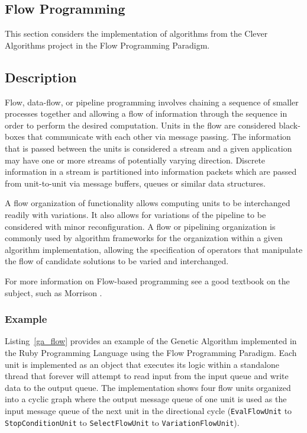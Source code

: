 % 
% 
\subsection{Flow Programming}
\label{sec:flow}
This section considers the implementation of algorithms from the Clever Algorithms project in the Flow Programming Paradigm.

\subsection{Description}
Flow, data-flow, or pipeline programming involves chaining a sequence of smaller processes together and allowing a flow of information through the sequence in order to perform the desired computation. Units in the flow are considered black-boxes that communicate with each other via message passing. The information that is passed between the units is considered a stream and a given application may have one or more streams of potentially varying direction. Discrete information in a stream is partitioned into information packets which are passed from unit-to-unit via message buffers, queues or similar data structures.

A flow organization of functionality allows computing units to be interchanged readily with variations. It also allows for variations of the pipeline to be considered with minor reconfiguration. A flow or pipelining organization is commonly used by algorithm frameworks for the organization within a given algorithm implementation, allowing the specification of operators that manipulate the flow of candidate solutions to be varied and interchanged.

For more information on Flow-based programming see a good textbook on the subject, such as Morrison \cite{Morrison2010}.

\subsubsection{Example}
Listing~\ref{ga_flow} provides an example of the Genetic Algorithm implemented in the Ruby Programming Language using the Flow Programming Paradigm.
Each unit is implemented as an object that executes its logic within a standalone thread that forever will attempt to read input from the input queue and write data to the output queue. The implementation shows four flow units organized into a cyclic graph where the output message queue of one unit is used as the input message queue of the next unit in the directional cycle (\texttt{EvalFlowUnit} to \texttt{StopConditionUnit} to \texttt{SelectFlowUnit} to \texttt{VariationFlowUnit}). 

